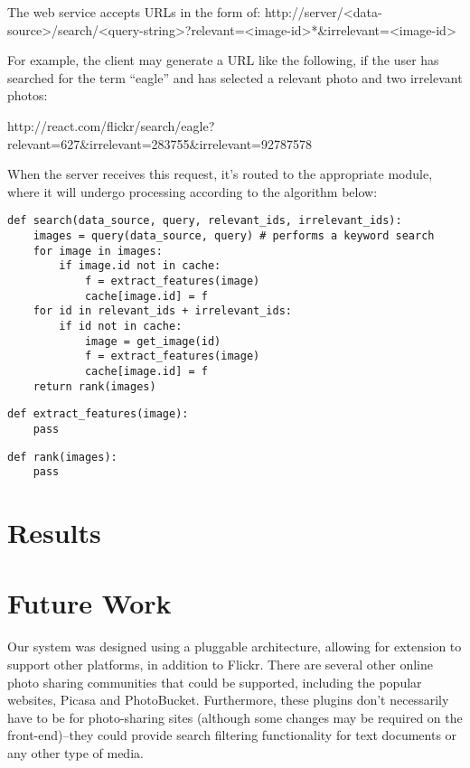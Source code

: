 \documentclass{article}
\begin{document}
The web service accepts URLs in the form of: http://\<server\>/<data-source>/search/<query-string>?{relevant=<image-id>}*\&{irrelevant=<image-id>}

For example, the client may generate a URL like the following, if the user has searched for the term ``eagle'' and has selected
a relevant photo and two irrelevant photos:

http://react.com/flickr/search/eagle?relevant=627\&irrelevant=283755\&irrelevant=92787578

When the server receives this request, it's routed to the appropriate module, where it will undergo processing according
to the algorithm below:

\lstset{
    language=Python,
    basicstyle=\small\sffamily,
    numbers=left,
    numberstyle=\tiny,
    frame=tb,
    columns=fullflexible,
    showstringspaces=false
}

\begin{lstlisting}[caption=my source code]
def search(data_source, query, relevant_ids, irrelevant_ids):
    images = query(data_source, query) # performs a keyword search
    for image in images:
        if image.id not in cache:
            f = extract_features(image)
            cache[image.id] = f
    for id in relevant_ids + irrelevant_ids:
        if id not in cache:
            image = get_image(id)
            f = extract_features(image)
            cache[image.id] = f
    return rank(images)
\end{lstlisting}

\begin{lstlisting}[caption=my source code 2]
def extract_features(image):
    pass
\end{lstlisting}

\begin{lstlisting}[caption=my source code 3]
def rank(images):
    pass
\end{lstlisting}




\section{Results}


\section{Future Work}
Our system was designed using a pluggable architecture, allowing for extension to support other platforms, in
addition to Flickr.  There are several other online photo sharing communities that could be supported, including the
popular websites, Picasa and PhotoBucket.  Furthermore, these plugins don't necessarily have to be for photo-sharing
sites (although some changes may be required on the front-end)--they could provide search filtering functionality for
text documents or any other type of media.
\end{document}
